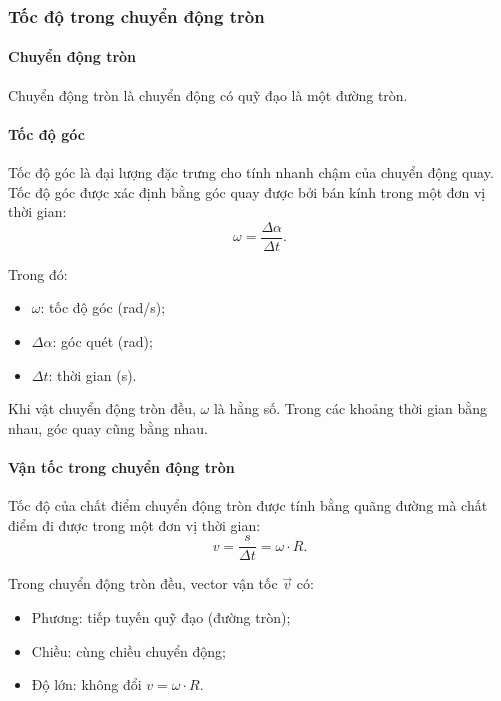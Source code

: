 \begin{tomtat}
	\subsubsection{Tốc độ trong chuyển động tròn}
	\paragraph{Chuyển động tròn}
	\begin{dn}
		Chuyển động tròn là chuyển động có quỹ đạo là một đường tròn.
	\end{dn}
	\paragraph{Tốc độ góc}
	\begin{dn}
		Tốc độ góc là đại lượng đặc trưng cho tính nhanh chậm của chuyển động quay.\\
		Tốc độ góc được xác định bằng góc quay được bởi bán kính trong một đơn vị thời gian:
		$$\omega=\dfrac{\Delta \alpha}{\Delta t}.$$
	\end{dn}
	Trong đó:
	\begin{itemize}
		\item $\omega$: tốc độ góc (\si{\radian/\second});
		\item $\Delta \alpha$: góc quét (\si{\radian});
		\item $\Delta t$: thời gian (\si{\second}).
	\end{itemize}
	\begin{note}
		Khi vật chuyển động tròn đều, $\omega$ là hằng số. Trong các khoảng thời gian bằng nhau, góc quay cũng bằng nhau.
	\end{note}
	\paragraph{Vận tốc trong chuyển động tròn}
	\begin{boxdn}
		Tốc độ của chất điểm chuyển động tròn được tính bằng quãng đường mà chất điểm đi được trong một đơn vị thời gian:
		$$v=\dfrac{s}{\Delta t}=\omega\cdot R.$$
	\end{boxdn}
	Trong chuyển động tròn đều, vector vận tốc $\vec{v}$ có:
	\begin{itemize}
		\item Phương: tiếp tuyến quỹ đạo (đường tròn);
		\item Chiều: cùng chiều chuyển động;
		\item Độ lớn: không đổi $v=\omega\cdot R$.
	\end{itemize}

\end{tomtat}
